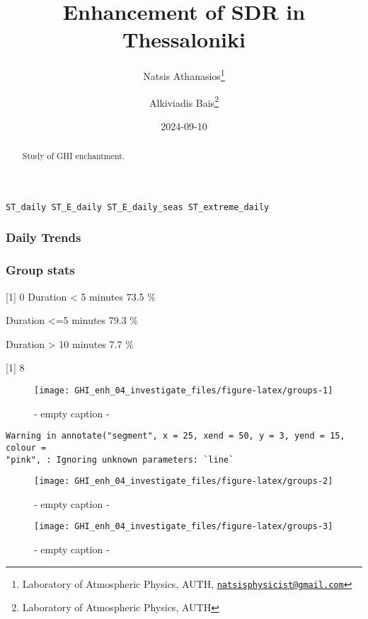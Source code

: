 \documentclass[
  10pt,
  a4paper,oneside]{article}
\title{Enhancement of SDR in Thessaloniki}
\author{Natsis Athanasios\footnote{Laboratory of Atmospheric Physics, AUTH, \href{mailto:natsisphysicist@gmail.com}{\nolinkurl{natsisphysicist@gmail.com}}} \and Alkiviadis Bais\footnote{Laboratory of Atmospheric Physics, AUTH}}
\date{2024-09-10}
\begin{document}
\maketitle
\begin{abstract}
Study of GHI enchantment.
\end{abstract}

{
\hypersetup{linkcolor=}
\setcounter{tocdepth}{4}
\tableofcontents
}
\begin{verbatim}
ST_daily ST_E_daily ST_E_daily_seas ST_extreme_daily
\end{verbatim}

\newpage
\FloatBarrier

\hypertarget{daily-trends}{%
\subsubsection{Daily Trends}\label{daily-trends}}

\newpage
\FloatBarrier

\hypertarget{group-stats}{%
\subsubsection{Group stats}\label{group-stats}}

{[}1{]} 0
Duration \textless{} 5 minutes 73.5 \%

Duration \textless=5 minutes 79.3 \%

Duration \textgreater{} 10 minutes 7.7 \%

{[}1{]} 8

\begin{figure}[H]

{\centering \texttt{[image: GHI\_enh\_04\_investigate\_files/figure-latex/groups-1]} 

}

\caption{ - empty caption - }\label{fig:groups-1}
\end{figure}

\begin{verbatim}
Warning in annotate("segment", x = 25, xend = 50, y = 3, yend = 15, colour =
"pink", : Ignoring unknown parameters: `line`
\end{verbatim}

\begin{figure}[H]

{\centering \texttt{[image: GHI\_enh\_04\_investigate\_files/figure-latex/groups-2]} 

}

\caption{ - empty caption - }\label{fig:groups-2}
\end{figure}
\begin{figure}[H]

{\centering \texttt{[image: GHI\_enh\_04\_investigate\_files/figure-latex/groups-3]} 

}

\caption{ - empty caption - }\label{fig:groups-3}
\end{figure}
\end{document}
